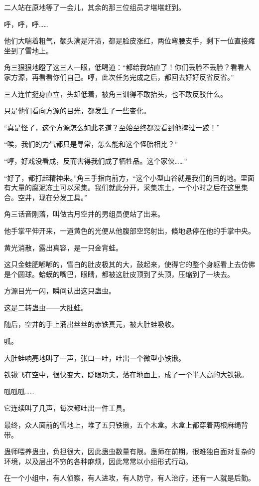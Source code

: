 \begin{this_body}
二人站在原地等了一会儿，其余的那三位组员才堪堪赶到。

呼，呼，呼……

他们大喘着粗气，额头满是汗渍，都是脸皮涨红，两位弯腰支手，剩下一位直接瘫坐到了雪地上。

角三狠狠地瞪了这三人一眼，低喝道：“都给我站直了！你们丢脸不丢脸？看看人家方源，再看看你们自己。哼，此次任务完成之后，都回去好好反省反省。”

三人连忙挺身直立，头却低着，被角三训得不敢抬头，也不敢反驳什么。

只是他们看向方源的目光，都发生了一些变化。

“真是怪了，这个方源怎么如此老道？至始至终都没看到他摔过一跤！”

“唉，我们的力气都只是寻常，怎么能和这个怪胎相比？”

“哼，好戏没看成，反而害得我们成了牺牲品。这个家伙……”

“好了，都打起精神来。”角三手指向前方，“这个小型山谷就是我们的目的地。里面有大量的腐泥冻土可以采集。我们就此分开，采集冻土，一个小时之后在这里集合。空井，现在分发工具。”

角三话音刚落，叫做古月空井的男组员便站了出来。

他手掌平伸开来，一道黄色的光便从他腹部空窍射出，倏地悬停在他的手掌中央。

黄光消散，露出真容，是一只金背蛙。

这只金蛙肥嘟嘟的，雪白的肚皮极其的大，鼓起来，使得它的整个身躯看上去仿佛是个圆球。蛤蟆的嘴巴，眼睛，都被这肚皮顶到了头顶，压缩到了一块去。

方源目光一闪，瞬间认出这只蛊虫。

这是二转蛊虫——大肚蛙。

随后，空井的手上涌出丝丝的赤铁真元，被大肚蛙吸收。

呱。

大肚蛙响亮地叫了一声，张口一吐，吐出一个微型小铁锹。

铁锹飞在空中，很快变大，眨眼功夫，落在地面上，成了一个半人高的大铁锹。

呱呱呱……

它连续叫了几声，每次都吐出一件工具。

最终，众人面前的雪地上，堆了五只铁锹，五个木盒。木盒上都穿着两根麻绳背带。

蛊师喂养蛊虫，负担很大，因此蛊虫数量有限。蛊师在前期，很难独自面对复杂的环境，以及层出不穷的各种麻烦，因此常常以小组形式行动。

在一个小组中，有人侦察，有人进攻，有人防守，有人治疗，还有一人就是后勤。


\end{this_body}
